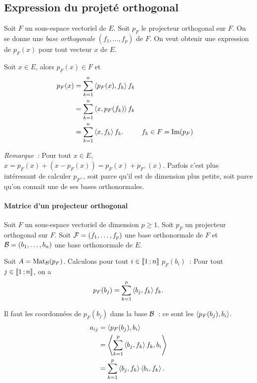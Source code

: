 \subsection{Expression du projeté orthogonal}

Soit \(F\) un sous-espace vectoriel de \(E\). Soit \(p_F\) le projecteur 
orthogonal sur \(F\). On se donne une \emph{base orthogonale} \((f_1, \ldots, 
f_p)\) de \(F\). On veut obtenir une expression de \(p_F(x)\) pour tout 
vecteur \(x\) de \(E\).

Soit \(x \in E\), alors \(p_F(x) \in F\) et
\begin{align}
  p_F(x) &=\sum_{k=1}^n \left\langle{p_F(x)},{f_k}\right\rangle f_k \\
  &=\sum_{k=1}^n \left\langle{x},{p_F(f_k)}\right\rangle f_k \\
  &=\sum_{k=1}^n \left\langle{x},{f_k}\right\rangle f_k. && f_k \in F=\operatorname{Im}(p_F)
\end{align}

\emph{Remarque~:} Pour tout \(x \in E\), \(x = p_F(x) +(x-p_F(x)) = p_F(x) + 
p_{F^\perp}(x)\). Parfois c'est plus intéressant de calculer \(p_{F^\perp}\), 
soit parce qu'il est de dimension plus petite, soit parce qu'on connait une de 
ses bases orthonormales.

\paragraph{Matrice d'un projecteur orthogonal}
Soit \(F\) un sous-espace vectoriel de dimension \(p \geqslant 1\). Soit 
\(p_F\) un projecteur orthogonal sur \(F\). Soit \(\mathcal{F}=(f_1, \ldots, f_p)\) une 
base orthonormale de \(F\) et \(\mathcal{B}=(b_1, \ldots, b_n)\) une base orthonormale 
de \(E\).

Soit \(A=\mathrm{Mat}_{\mathcal{B}}(p_F)\). Calculons pour tout \(i \in \mathopen{\llbracket}1\mathclose{}\mathpunct{};n\mathclose{\rrbracket}\) 
\(p_F(b_i)\)~: Pour tout \(j \in \mathopen{\llbracket}1\mathclose{}\mathpunct{};n\mathclose{\rrbracket}\), on a
\begin{equation}
  p_F(b_j)=\sum_{k=1}^p \left\langle{b_j},{f_k}\right\rangle f_k.
\end{equation}

Il faut les coordonnées de \(p_F(b_j)\) dans la base \(\mathcal{B}\)~: ce sont les 
\(\left\langle{p_F(b_j)},{b_i}\right\rangle\).
\begin{align}
  a_{ij} &= \left\langle{p_F(b_j)},{b_i}\right\rangle \\
  &= \left\langle{\sum_{k=1}^p \left\langle{b_j},{f_k}\right\rangle f_k},{b_i}\right\rangle \\
  &= \sum_{k=1}^p \left\langle{b_j},{f_k}\right\rangle \left\langle{b_i},{f_k}\right\rangle.
\end{align}

